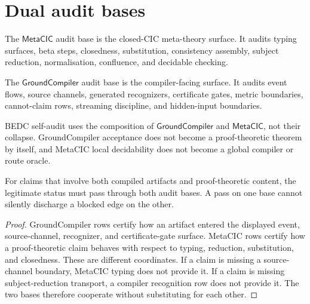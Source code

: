 \section{Dual audit bases}
\label{sec:legitimate-claim-dual-audit-bases}

\begin{definition}
\label{def:claim-metacic-audit-base}
The $\mathsf{MetaCIC}$ audit base is the closed-CIC meta-theory surface.  It
audits typing surfaces, beta steps, closedness, substitution, consistency
assembly, subject reduction, normalisation, confluence, and decidable
checking.
\end{definition}

\begin{definition}
\label{def:claim-groundcompiler-audit-base}
The $\mathsf{GroundCompiler}$ audit base is the compiler-facing surface.  It
audits event flows, source channels, generated recognizers, certificate
gates, metric boundaries, cannot-claim rows, streaming discipline, and
hidden-input boundaries.
\end{definition}

\begin{principle}
\label{prin:claim-dual-base-non-collapse}
BEDC self-audit uses the composition of $\mathsf{GroundCompiler}$ and
$\mathsf{MetaCIC}$, not their collapse.  GroundCompiler acceptance does not
become a proof-theoretic theorem by itself, and MetaCIC local decidability
does not become a global compiler or route oracle.
\end{principle}

\begin{theorem}
\label{thm:dual-audit-claim-status}
For claims that involve both compiled artifacts and proof-theoretic content,
the legitimate status must pass through both audit bases.  A pass on one
base cannot silently discharge a blocked edge on the other.
\end{theorem}

\begin{proof}
GroundCompiler rows certify how an artifact entered the displayed event,
source-channel, recognizer, and certificate-gate surface.  MetaCIC rows
certify how a proof-theoretic claim behaves with respect to typing,
reduction, substitution, and closedness.  These are different coordinates.
If a claim is missing a source-channel boundary, MetaCIC typing does not
provide it.  If a claim is missing subject-reduction transport, a compiler
recognition row does not provide it.  The two bases therefore cooperate
without substituting for each other.
\end{proof}

